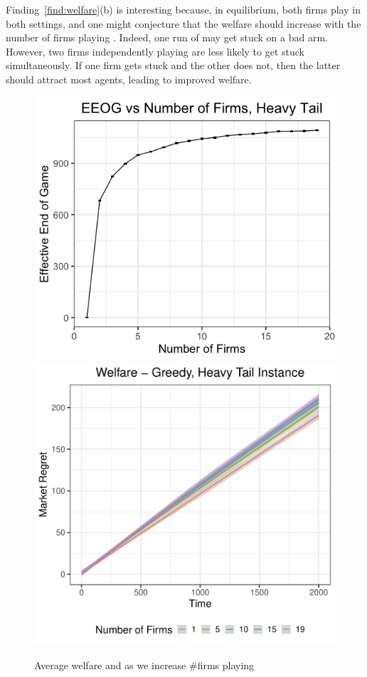 \documentclass[../competing_bandits_with_appendix.tex]{subfiles}
\begin{document}
Finding~\ref{find:welfare}(b) is interesting because, in equilibrium, both firms play \DG in both settings, and one might conjecture that the welfare should increase with the number of firms playing \DG. Indeed, one run of \DG may get stuck on a bad arm. However, two firms independently playing \DG are less likely to get stuck simultaneously. If one firm gets stuck and the other does not, then the latter should attract most agents, leading to improved welfare.
\begin{figure}
\centering
\includegraphics[scale=0.3]{ec19paper/figures/eeog_vs_num_ht}
\includegraphics[scale=0.3]{ec19paper/figures/ht_many_firm_welfare}\\
\caption{Average welfare and \Eeog as we increase \#firms playing \DG}
\label{many_firm_welfare}
\end{figure}
\end{document}
